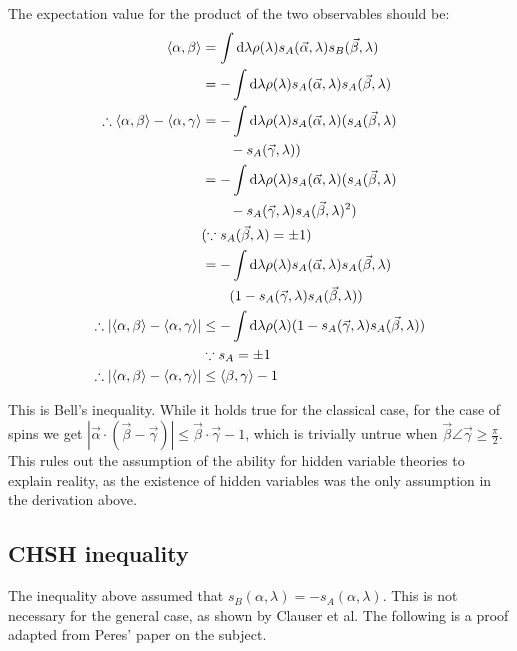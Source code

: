 \documentclass[10pt, twocolumn]{article}
\begin{document}
The expectation value for the product of the two observables should be:
\begin{align*}
\Braket{\alpha,\beta} &= \int \mathrm d \lambda\rho(\lambda) s_A(\vec \alpha,\lambda) s_B(\vec \beta,\lambda)\\
&= -\int \mathrm d \lambda\rho(\lambda) s_A(\vec \alpha,\lambda) s_A(\vec \beta,\lambda)\\
\therefore \Braket{\alpha,\beta} - \Braket{\alpha,\gamma} &= -\int \mathrm d \lambda\rho(\lambda)s_A(\vec \alpha,\lambda)(s_A(\vec \beta,\lambda) \\&\qquad- s_A(\vec\gamma,\lambda))\\
&=-\int \mathrm d \lambda\rho(\lambda)s_A(\vec \alpha,\lambda)(s_A(\vec \beta,\lambda) \\&\qquad - s_A(\vec\gamma,\lambda)s_A(\vec \beta,\lambda)^2)\\
&(\because s_A(\vec \beta,\lambda)=\pm 1)\\
&=-\int \mathrm d \lambda\rho(\lambda)s_A(\vec \alpha,\lambda)s_A(\vec \beta,\lambda)\\&\qquad(1 - s_A(\vec\gamma,\lambda)s_A(\vec \beta,\lambda))\\
\therefore \left|\Braket{\alpha,\beta} - \Braket{\alpha,\gamma}\right|&\leq -\int \mathrm d \lambda\rho(\lambda)(1 - s_A(\vec\gamma,\lambda)s_A(\vec \beta,\lambda))\\
&\because s_A = \pm 1\\
\therefore  \left|\Braket{\alpha,\beta} - \Braket{\alpha,\gamma}\right| &\leq \Braket{\beta, \gamma} - 1
\end{align*}

This is Bell's inequality. While it holds true for the classical case, for the case of spins we get $|\vec\alpha\cdot(\vec\beta-\vec\gamma)|\leq\vec\beta\cdot\vec\gamma - 1$, which is trivially untrue when $\vec\beta\angle\vec\gamma \geq \frac\pi2$.\\

This rules out the assumption of the ability for hidden variable theories to explain reality, as the existence of hidden variables was the only assumption in the derivation above.

\subsection{CHSH inequality}
The inequality above assumed that $s_B(\alpha,\lambda)=-s_A(\alpha,\lambda)$. This is not necessary for the general case, as shown by Clauser et al\cite{chsh}. The following is a proof adapted from Peres' paper\cite{teorema} on the subject.\\
\end{document}

